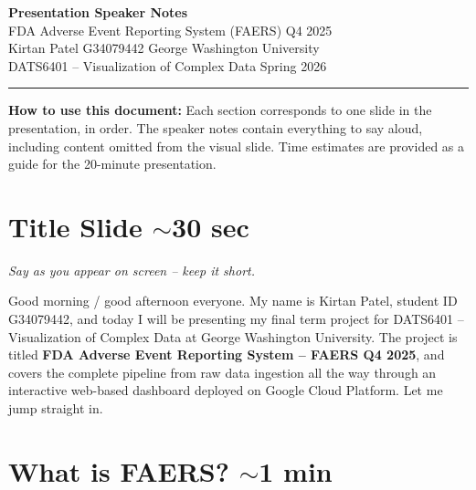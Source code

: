 \documentclass[12pt, letterpaper]{article}
\begin{document}
\begin{center}
  {\LARGE\bfseries\color{slideblue} Presentation Speaker Notes}\\[6pt]
  {\large FDA Adverse Event Reporting System (FAERS) Q4 2025}\\[4pt]
  {\normalsize Kirtan Patel \quad G34079442 \quad George Washington University}\\[2pt]
  {\normalsize DATS6401 -- Visualization of Complex Data \quad Spring 2026}
\end{center}

\vspace{4pt}
\textcolor{accent}{\rule{\linewidth}{1pt}}
\vspace{8pt}

\begin{notebox}
\textbf{How to use this document:} Each section corresponds to one slide in the
presentation, in order. The speaker notes contain everything to say aloud,
including content omitted from the visual slide. Time estimates are provided as
a guide for the 20-minute presentation.
\end{notebox}

\vspace{10pt}

\section{Title Slide \hfill \textcolor{slidenumber}{\small $\sim$30 sec}}

\begin{notebox}
\textit{Say as you appear on screen -- keep it short.}
\end{notebox}

Good morning / good afternoon everyone. My name is Kirtan Patel, student ID
G34079442, and today I will be presenting my final term project for DATS6401 --
Visualization of Complex Data at George Washington University. The project is
titled \textbf{FDA Adverse Event Reporting System -- FAERS Q4 2025}, and covers
the complete pipeline from raw data ingestion all the way through an interactive
web-based dashboard deployed on Google Cloud Platform. Let me jump straight in.

\section{What is FAERS? \hfill \textcolor{slidenumber}{\small $\sim$1 min}}
\end{document}
